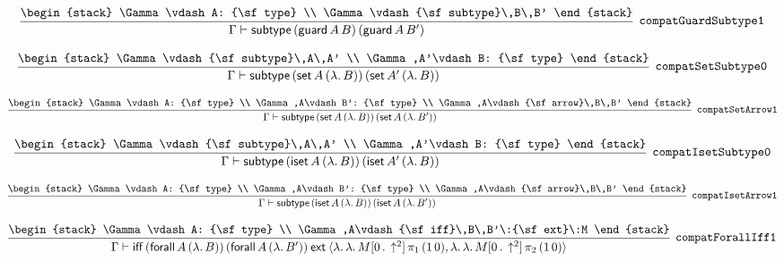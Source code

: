 \[
\infer[{\tt compatGuardSubtype1}]{\Gamma \vdash {\sf subtype}\,({\sf guard}\,A\,B)\,({\sf guard}\,A\,B')}{
\begin{stack}
\Gamma \vdash A: {\sf type}
\\
\Gamma \vdash {\sf subtype}\,B\,B'
\end{stack}}
\]

\[
\infer[{\tt compatSetSubtype0}]{\Gamma \vdash {\sf subtype}\,({\sf set}\,A\,(\lambda .\,B))\,({\sf set}\,A'\,(\lambda .\,B))}{
\begin{stack}
\Gamma \vdash {\sf subtype}\,A\,A'
\\
\Gamma ,A'\vdash B: {\sf type}
\end{stack}}
\]

\[
\infer[{\tt compatSetArrow1}]{\Gamma \vdash {\sf subtype}\,({\sf set}\,A\,(\lambda .\,B))\,({\sf set}\,A\,(\lambda .\,B'))}{
\begin{stack}
\Gamma \vdash A: {\sf type}
\\
\Gamma ,A\vdash B': {\sf type}
\\
\Gamma ,A\vdash {\sf arrow}\,B\,B'
\end{stack}}
\]

\[
\infer[{\tt compatIsetSubtype0}]{\Gamma \vdash {\sf subtype}\,({\sf iset}\,A\,(\lambda .\,B))\,({\sf iset}\,A'\,(\lambda .\,B))}{
\begin{stack}
\Gamma \vdash {\sf subtype}\,A\,A'
\\
\Gamma ,A'\vdash B: {\sf type}
\end{stack}}
\]

\[
\infer[{\tt compatIsetArrow1}]{\Gamma \vdash {\sf subtype}\,({\sf iset}\,A\,(\lambda .\,B))\,({\sf iset}\,A\,(\lambda .\,B'))}{
\begin{stack}
\Gamma \vdash A: {\sf type}
\\
\Gamma ,A\vdash B': {\sf type}
\\
\Gamma ,A\vdash {\sf arrow}\,B\,B'
\end{stack}}
\]

\[
\infer[{\tt compatForallIff1}]{\Gamma \vdash {\sf iff}\,({\sf forall}\,A\,(\lambda .\,B))\,({\sf forall}\,A\,(\lambda .\,B'))\:{\sf ext}\:\langle \lambda .\,\lambda .\,M[0\,.\,\uparrow^2]\, \pi_1\,(1\,0),\lambda .\,\lambda .\,M[0\,.\,\uparrow^2]\, \pi_2\,(1\,0)\rangle }{
\begin{stack}
\Gamma \vdash A: {\sf type}
\\
\Gamma ,A\vdash {\sf iff}\,B\,B'\:{\sf ext}\:M
\end{stack}}
\]

